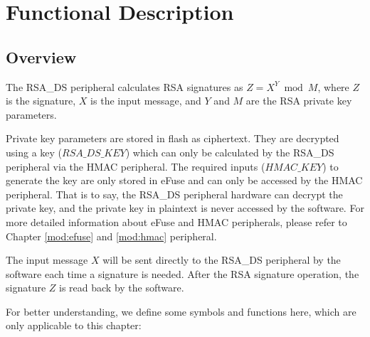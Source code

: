 \documentclass[main\_\_EN.tex]{subfiles}
\begin{document}
\section{Functional Description}
\subsection{Overview}

The RSA\_DS peripheral calculates RSA signatures as \begin{math}Z = X^{Y} \bmod M\end{math}, where \begin{math}Z\end{math} is the signature, \begin{math}X\end{math} is the input message, and \begin{math}Y\end{math} and \begin{math}M\end{math} are the RSA private key parameters.

Private key parameters are stored in flash as ciphertext. They are decrypted using a key (\begin{math} RSA\_DS\_KEY \end{math}) which can only be calculated by the RSA\_DS peripheral via the HMAC peripheral. The required inputs (\begin{math} HMAC\_KEY \end{math}) to generate the key are only stored in eFuse and can only be accessed by the HMAC peripheral. That is to say, the RSA\_DS peripheral hardware can decrypt the private key, and the private key in plaintext is never accessed by the software. For more detailed information about eFuse and HMAC peripherals, please refer to Chapter \ref{mod:efuse} \textit{} and \ref{mod:hmac} \textit{} peripheral. 

The input message \begin{math}X\end{math} will be sent directly to the RSA\_DS peripheral by the software each time a signature is needed. After the RSA signature operation, the signature \begin{math}Z\end{math} is read back by the software.

For better understanding, we define some symbols and functions here, which are only applicable to this chapter:
\end{document}
